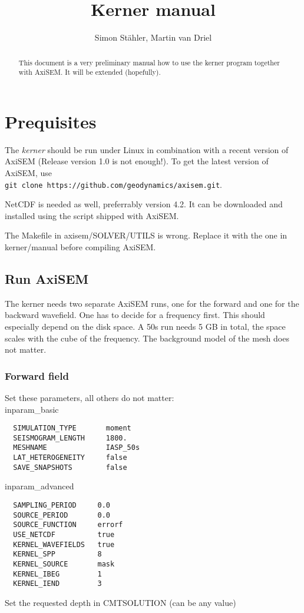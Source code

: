 \documentclass[a4wide]{scrartcl}
\author{Simon Stähler, Martin van Driel}
\title{Kerner manual}
\begin{document}
 \maketitle
 
 \begin{abstract}
  This document is a very preliminary manual how to use the kerner program together with AxiSEM. It will be extended (hopefully).
 \end{abstract} 
 
 \section{Prequisites}
 The \textit{kerner} should be run under Linux in combination with a recent version of AxiSEM (Release version 1.0 is not enough!). To get the latest version of AxiSEM, use \\
 \verb|git clone https://github.com/geodynamics/axisem.git|.
 
 NetCDF is needed as well, preferrably version 4.2. It can be downloaded and installed using the script shipped with AxiSEM.
 
 The Makefile in axisem/SOLVER/UTILS is wrong. Replace it with the one in kerner/manual before compiling AxiSEM.
 \subsection{Run AxiSEM}
 The kerner needs two separate AxiSEM runs, one for the forward and one for the backward wavefield. One has to decide for a frequency first. This should especially depend on the disk space. A 50s run needs 5 GB in total, the space scales with the cube of the frequency. The background model of the mesh does not matter.
 \subsubsection{Forward field}
 Set these parameters, all others do not matter: \\
 inparam\_basic
 \begin{verbatim}
  SIMULATION_TYPE   	moment
  SEISMOGRAM_LENGTH  	1800.
  MESHNAME            	IASP_50s
  LAT_HETEROGENEITY   	false
  SAVE_SNAPSHOTS       	false
 \end{verbatim}
 inparam\_advanced
 \begin{verbatim}
  SAMPLING_PERIOD     0.0
  SOURCE_PERIOD       0.0
  SOURCE_FUNCTION     errorf
  USE_NETCDF          true
  KERNEL_WAVEFIELDS   true
  KERNEL_SPP          8
  KERNEL_SOURCE       mask
  KERNEL_IBEG         1
  KERNEL_IEND         3
 \end{verbatim}
 Set the requested depth in CMTSOLUTION (can be any value)
 
\end{document}
